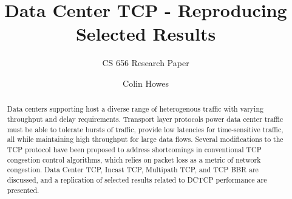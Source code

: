 \documentclass[sigconf]{acmart}
\begin{document}
\title{Data Center TCP - Reproducing Selected Results}
\subtitle{CS 656 Research Paper}


\author{Colin Howes}

\begin{abstract}

Data centers supporting host a diverse range of heterogenous traffic with varying throughput and delay requirements. Transport layer protocols power data center traffic must be able to tolerate bursts of traffic, provide low latencies for time-sensitive traffic, all while maintaining high throughput for large data flows. Several modifications to the TCP protocol have been proposed to address shortcomings in conventional TCP congestion control algorithms, which relies on packet loss as a metric of network congestion. Data Center TCP, Incast TCP, Multipath TCP, and TCP BBR are discussed, and a replication of selected results related to DCTCP performance are presented.

\end{abstract}

\maketitle




 
\end{document}
